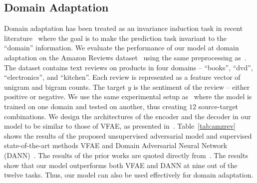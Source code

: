 \subsection{Domain Adaptation}

Domain adaptation has been treated as an invariance induction task in recent literature~\cite{bib:dann,bib:vfae} where the goal is to make the prediction task invariant to the ``domain'' information. We evaluate the performance of our model at domain adaptation on the Amazon Reviews dataset~\cite{bib:amzrev} using the same preprocessing as~\cite{bib:vfae}. The dataset contains text reviews on products in four domains -- ``books'', ``dvd'', ``electronics'', and ``kitchen''. Each review is represented as a feature vector of unigram and bigram counts. The target $y$ is the sentiment of the review -- either positive or negative. We use the same experimental setup as~\cite{bib:dann,bib:vfae} where the model is trained on one domain and tested on another, thus creating $12$ source-target combinations. We design the architectures of the encoder and the decoder in our model to be similar to those of VFAE, as presented in~\cite{bib:vfae}. Table~\ref{tab:amzrev} shows the results of the proposed unsupervised adversarial model and supervised state-of-the-art methods VFAE and Domain Adversarial Neural Network (DANN)~\cite{bib:dann}. The results of the prior works are quoted directly from~\cite{bib:vfae}. The results show that our model outperforms both VFAE and DANN at nine out of the twelve tasks. Thus, our model can also be used effectively for domain adaptation.

